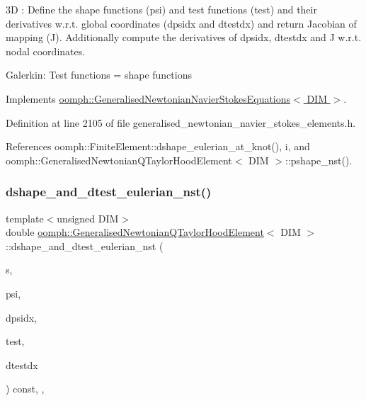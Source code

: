 3D \+: Define the shape functions (psi) and test functions (test) and their derivatives w.\+r.\+t. global coordinates (dpsidx and dtestdx) and return Jacobian of mapping (J). Additionally compute the derivatives of dpsidx, dtestdx and J w.\+r.\+t. nodal coordinates.

Galerkin\+: Test functions = shape functions 

Implements \hyperlink{classoomph_1_1GeneralisedNewtonianNavierStokesEquations_a24a93b73dba66e04eabb9b37a9360daa}{oomph\+::\+Generalised\+Newtonian\+Navier\+Stokes\+Equations$<$ D\+I\+M $>$}.



Definition at line 2105 of file generalised\+\_\+newtonian\+\_\+navier\+\_\+stokes\+\_\+elements.\+h.



References oomph\+::\+Finite\+Element\+::dshape\+\_\+eulerian\+\_\+at\+\_\+knot(), i, and oomph\+::\+Generalised\+Newtonian\+Q\+Taylor\+Hood\+Element$<$ D\+I\+M $>$\+::pshape\+\_\+nst().

\mbox{\label{classoomph_1_1GeneralisedNewtonianQTaylorHoodElement_a0a9108e22aaa3d647f58929e19b488a0}} 
\subsubsection{\texorpdfstring{dshape\+\_\+and\+\_\+dtest\+\_\+eulerian\+\_\+nst()}{dshape\_and\_dtest\_eulerian\_nst()}}
{\footnotesize\ttfamily template$<$unsigned D\+IM$>$ \\
double \hyperlink{classoomph_1_1GeneralisedNewtonianQTaylorHoodElement}{oomph\+::\+Generalised\+Newtonian\+Q\+Taylor\+Hood\+Element}$<$ D\+IM $>$\+::dshape\+\_\+and\+\_\+dtest\+\_\+eulerian\+\_\+nst (\begin{DoxyParamCaption}\item[{const \hyperlink{classoomph_1_1Vector}{Vector}$<$ double $>$ \&}]{s,  }\item[{\hyperlink{classoomph_1_1Shape}{Shape} \&}]{psi,  }\item[{\hyperlink{classoomph_1_1DShape}{D\+Shape} \&}]{dpsidx,  }\item[{\hyperlink{classoomph_1_1Shape}{Shape} \&}]{test,  }\item[{\hyperlink{classoomph_1_1DShape}{D\+Shape} \&}]{dtestdx }\end{DoxyParamCaption}) const\hspace{0.3cm}{\ttfamily [inline]}, {\ttfamily [protected]}, {\ttfamily [virtual]}}



